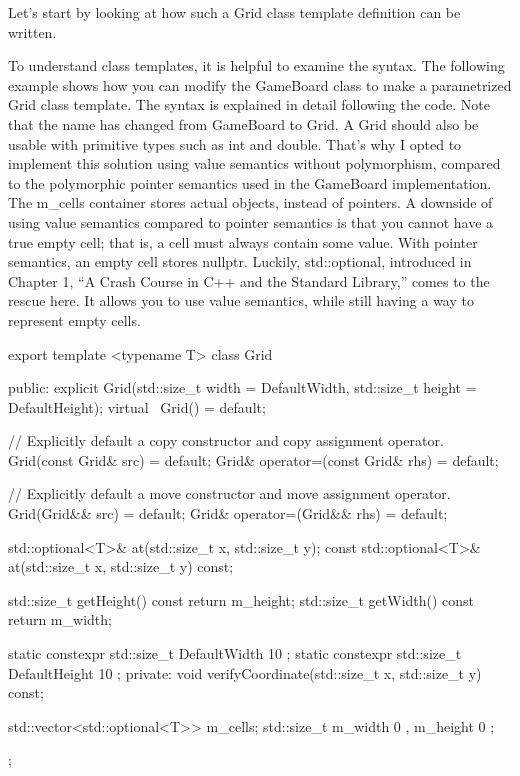 Let’s start by looking at how such a Grid class template definition can be written.


To understand class templates, it is helpful to examine the syntax. The following example shows how you can modify the GameBoard class to make a parametrized Grid class template. The syntax is explained in detail following the code. Note that the name has changed from GameBoard to Grid. A Grid should also be usable with primitive types such as int and double. That’s why I opted to implement this solution using value semantics without polymorphism, compared to the polymorphic pointer semantics used in the GameBoard implementation. The m\_cells container stores actual objects, instead of pointers. A downside of using value semantics compared to pointer semantics is that you cannot have a true empty cell; that is, a cell must always contain some value. With pointer semantics, an empty cell stores nullptr. Luckily, std::optional, introduced in Chapter 1, “A Crash Course in C++ and the Standard Library,” comes to the rescue here. It allows you to use value semantics, while still having a way to represent empty cells.

\begin{cpp}
export template <typename T>
class Grid
{
    public:
        explicit Grid(std::size_t width = DefaultWidth,
            std::size_t height = DefaultHeight);
        virtual ~Grid() = default;

        // Explicitly default a copy constructor and copy assignment operator.
        Grid(const Grid& src) = default;
        Grid& operator=(const Grid& rhs) = default;

        // Explicitly default a move constructor and move assignment operator.
        Grid(Grid&& src) = default;
        Grid& operator=(Grid&& rhs) = default;

        std::optional<T>& at(std::size_t x, std::size_t y);
        const std::optional<T>& at(std::size_t x, std::size_t y) const;

        std::size_t getHeight() const { return m_height; }
        std::size_t getWidth() const { return m_width; }

        static constexpr std::size_t DefaultWidth { 10 };
        static constexpr std::size_t DefaultHeight { 10 };
    private:
        void verifyCoordinate(std::size_t x, std::size_t y) const;

        std::vector<std::optional<T>> m_cells;
        std::size_t m_width { 0 }, m_height { 0 };
};
\end{cpp}

